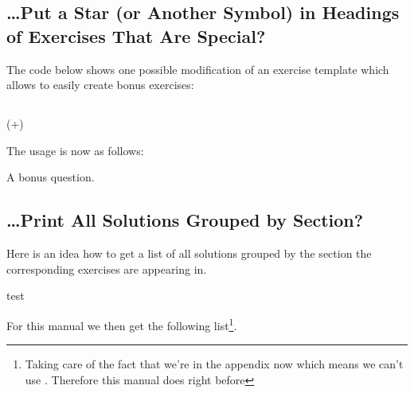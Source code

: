 \documentclass{xsim-manual}
\begin{document}
\subsection{\dots Put a Star (or Another Symbol) in Headings of Exercises That
  Are Special?}

The code below shows one possible modification of an exercise template which
allows to easily create bonus exercises:
\begin{sourcecode}
  \usepackage{amsymb}
    {%
      \subsection*
        {%
          \XSIMmixedcase{\GetExerciseName}\nobreakspace
          \IfInsideSolutionF
            {%
                { {\normalfont\itshape{}}}%
            }%
        }
        {%
          \marginpar
            {%
              \IfInsideSolutionF{\rule{1.2cm}{1pt}\slash}%
              \PropertyValue
                {\nobreakspace(+\PropertyValue)}%
              \nobreakspace{}%
            }%
        }%
    }
    {}
\end{sourcecode}

The usage is now as follows:
\begin{example}
  \begin{exercise}[bonus]
    A bonus question.
  \end{exercise}
\end{example}

\subsection{\dots Print All Solutions Grouped by Section?}
Here is an idea how to get a list of all solutions grouped by the section the
corresponding exercises are appearing in.
\begin{sourcecode}

  \setcounter{sections}{1}
  \whileboolexpr
    { test {} }
    {
      \printsolutions[section=\value{sections},headings-template=per-section]
    }
\end{sourcecode}
For this manual we then get the following list\footnote{Taking care of the
  fact that we're in the appendix now which means we can't use
  .  Therefore this manual does
   right before
  }.
\end{document}
